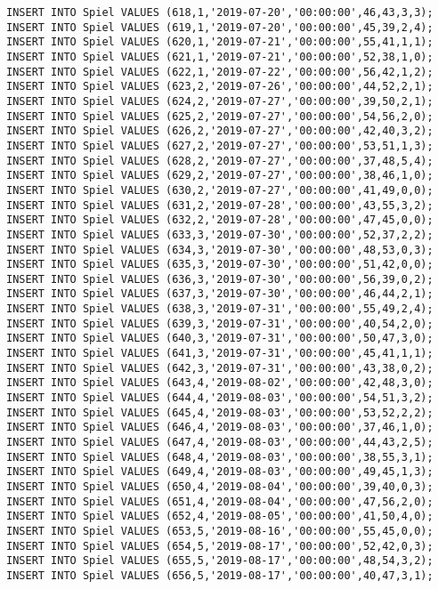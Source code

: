 \documentclass{lehramt-informatik-aufgabe}
\begin{document}
\begin{verbatim}
INSERT INTO Spiel VALUES (618,1,'2019-07-20','00:00:00',46,43,3,3);
INSERT INTO Spiel VALUES (619,1,'2019-07-20','00:00:00',45,39,2,4);
INSERT INTO Spiel VALUES (620,1,'2019-07-21','00:00:00',55,41,1,1);
INSERT INTO Spiel VALUES (621,1,'2019-07-21','00:00:00',52,38,1,0);
INSERT INTO Spiel VALUES (622,1,'2019-07-22','00:00:00',56,42,1,2);
INSERT INTO Spiel VALUES (623,2,'2019-07-26','00:00:00',44,52,2,1);
INSERT INTO Spiel VALUES (624,2,'2019-07-27','00:00:00',39,50,2,1);
INSERT INTO Spiel VALUES (625,2,'2019-07-27','00:00:00',54,56,2,0);
INSERT INTO Spiel VALUES (626,2,'2019-07-27','00:00:00',42,40,3,2);
INSERT INTO Spiel VALUES (627,2,'2019-07-27','00:00:00',53,51,1,3);
INSERT INTO Spiel VALUES (628,2,'2019-07-27','00:00:00',37,48,5,4);
INSERT INTO Spiel VALUES (629,2,'2019-07-27','00:00:00',38,46,1,0);
INSERT INTO Spiel VALUES (630,2,'2019-07-27','00:00:00',41,49,0,0);
INSERT INTO Spiel VALUES (631,2,'2019-07-28','00:00:00',43,55,3,2);
INSERT INTO Spiel VALUES (632,2,'2019-07-28','00:00:00',47,45,0,0);
INSERT INTO Spiel VALUES (633,3,'2019-07-30','00:00:00',52,37,2,2);
INSERT INTO Spiel VALUES (634,3,'2019-07-30','00:00:00',48,53,0,3);
INSERT INTO Spiel VALUES (635,3,'2019-07-30','00:00:00',51,42,0,0);
INSERT INTO Spiel VALUES (636,3,'2019-07-30','00:00:00',56,39,0,2);
INSERT INTO Spiel VALUES (637,3,'2019-07-30','00:00:00',46,44,2,1);
INSERT INTO Spiel VALUES (638,3,'2019-07-31','00:00:00',55,49,2,4);
INSERT INTO Spiel VALUES (639,3,'2019-07-31','00:00:00',40,54,2,0);
INSERT INTO Spiel VALUES (640,3,'2019-07-31','00:00:00',50,47,3,0);
INSERT INTO Spiel VALUES (641,3,'2019-07-31','00:00:00',45,41,1,1);
INSERT INTO Spiel VALUES (642,3,'2019-07-31','00:00:00',43,38,0,2);
INSERT INTO Spiel VALUES (643,4,'2019-08-02','00:00:00',42,48,3,0);
INSERT INTO Spiel VALUES (644,4,'2019-08-03','00:00:00',54,51,3,2);
INSERT INTO Spiel VALUES (645,4,'2019-08-03','00:00:00',53,52,2,2);
INSERT INTO Spiel VALUES (646,4,'2019-08-03','00:00:00',37,46,1,0);
INSERT INTO Spiel VALUES (647,4,'2019-08-03','00:00:00',44,43,2,5);
INSERT INTO Spiel VALUES (648,4,'2019-08-03','00:00:00',38,55,3,1);
INSERT INTO Spiel VALUES (649,4,'2019-08-03','00:00:00',49,45,1,3);
INSERT INTO Spiel VALUES (650,4,'2019-08-04','00:00:00',39,40,0,3);
INSERT INTO Spiel VALUES (651,4,'2019-08-04','00:00:00',47,56,2,0);
INSERT INTO Spiel VALUES (652,4,'2019-08-05','00:00:00',41,50,4,0);
INSERT INTO Spiel VALUES (653,5,'2019-08-16','00:00:00',55,45,0,0);
INSERT INTO Spiel VALUES (654,5,'2019-08-17','00:00:00',52,42,0,3);
INSERT INTO Spiel VALUES (655,5,'2019-08-17','00:00:00',48,54,3,2);
INSERT INTO Spiel VALUES (656,5,'2019-08-17','00:00:00',40,47,3,1);

\end{verbatim}
\end{document}
